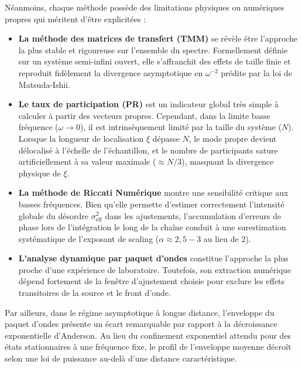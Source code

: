 \documentclass[11pt, a4paper, twoside]{article}
\begin{document}
Néanmoins, chaque méthode possède des limitations physiques ou numériques propres qui méritent d'être explicitées :
\begin{itemize}
    \item \textbf{La méthode des matrices de transfert (TMM)} se révèle être l'approche la plus stable et rigoureuse sur l'ensemble du spectre. Formellement définie sur un système semi-infini ouvert, elle s'affranchit des effets de taille finie et reproduit fidèlement la divergence asymptotique en $\omega^{-2}$ prédite par la loi de Matsuda-Ishii.
    \item \textbf{Le taux de participation (PR)} est un indicateur global très simple à calculer à partir des vecteurs propres. Cependant, dans la limite basse fréquence ($\omega \to 0$), il est intrinsèquement limité par la taille du système ($N$). Lorsque la longueur de localisation $\xi$ dépasse $N$, le mode propre devient délocalisé à l'échelle de l'échantillon, et le nombre de participants sature artificiellement à sa valeur maximale ($\approx N/3$), masquant la divergence physique de $\xi$.
    \item \textbf{La méthode de Riccati Numérique} montre une sensibilité critique aux basses fréquences. Bien qu'elle permette d'estimer correctement l'intensité globale du désordre $\sigma_{\mathrm{eff}}^2$ dans les ajustements, l'accumulation d'erreurs de phase lors de l'intégration le long de la chaîne conduit à une surestimation systématique de l'exposant de scaling ($\alpha \approx 2{,}5 - 3$ au lieu de $2$).
    \item \textbf{L'analyse dynamique par paquet d'ondes} constitue l'approche la plus proche d'une expérience de laboratoire. Toutefois, son extraction numérique dépend fortement de la fenêtre d'ajustement choisie pour exclure les effets transitoires de la source et le front d'onde.
\end{itemize}

Par ailleurs, dans le régime asymptotique à longue distance, l'enveloppe du paquet d'ondes présente un écart remarquable par rapport à la décroissance exponentielle d'Anderson. Au lieu du confinement exponentiel attendu pour des états stationnaires à une fréquence fixe, le profil de l'enveloppe moyenne décroît selon une loi de puissance au-delà d'une distance caractéristique. 
\end{document}

